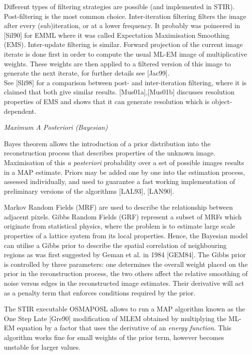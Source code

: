\documentclass{article}
\begin{document}
Different types of filtering strategies are possible (and implemented 
in STIR). Post-filtering is the most common choice. Inter-iteration 
filtering filters the image after every (sub)iteration, or at 
a lower frequency. It probably was poineered in [Sil90] for EMML 
where it was called Expectation Maximisation Smoothing (EMS). 
Inter-update filtering is similar. Forward
projection of the current image iterate is done first in order to
compute the usual ML-EM image of multiplicative weights. These weights are
then applied to a filtered version of this image to generate the next
iterate, for further details see [Jac99].\\
See [Sli98] for a comparison between post- and inter-iteration 
filtering, where it is claimed that both give similar results. 
[Mus01a],[Mus01b] discusses resolution properties of EMS and 
shows that it can generate resolution which is object-dependent.



\begin{spacing}{1.5}
\textit{Maximum A Posteriori (Bayesian)}


\end{spacing}

Bayes theorem allows the introduction of a prior distribution 
into the reconstruction process that describes properties of 
the unknown image. Maximisation of this \textit{a posteriori} probability 
over a set of possible images results in a MAP estimate. Priors 
may be added one by one into the estimation process, assessed 
individually, and used to guarantee a fast working implementation 
of preliminary versions of the algorithms [LAL93], [LAN90].

Markov Random Fields (MRF) are used to describe the relationship 
between adjacent pixels. Gibbs Random Fields (GRF) represent 
a subset of MRFs which originate from statistical physics, where 
the problem is to estimate large scale properties of a lattice 
system from its local properties. Hence, the Bayesian model can 
utilise a Gibbs prior to describe the spatial correlation of 
neighbouring regions as was first suggested by Geman et al. in 
1984 [GEM84]. The Gibbs prior is controlled by three parameters: 
one determines the overall weight placed on the prior in the 
reconstruction process, the two others affect the relative smoothing 
of noise versus edges in the reconstructed image estimates. Their 
derivative will act as a penalty term that enforces conditions 
required by the prior.

The STIR executable OSMAPOSL allows to run a MAP algorithm 
known as the One Step Late [Gre90] modification of MLEM obtained 
by multiplying the ML-EM equation by a factor that uses the derivative 
of an \textit{energy function}. This algorithm works fine 
for small weights of the prior term, however becomes unstable 
for larger values. 
\end{document}
